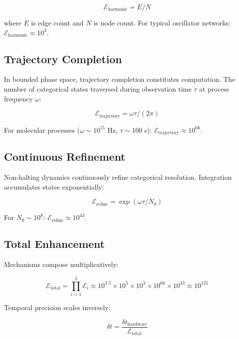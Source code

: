 \documentclass[10pt,twocolumn]{article}
\theoremstyle{definition}
\theoremstyle{remark}
\begin{document}
\begin{equation}
\mathcal{E}_{\text{harmonic}} = E / N
\end{equation}

where $E$ is edge count and $N$ is node count. For typical oscillator networks: $\mathcal{E}_{\text{harmonic}} \approx 10^{3}$.

\subsection{Trajectory Completion}

In bounded phase space, trajectory completion constitutes computation. The number of categorical states traversed during observation time $\tau$ at process frequency $\omega$:

\begin{equation}
\mathcal{E}_{\text{trajectory}} = \omega \tau / (2\pi)
\end{equation}

For molecular processes ($\omega \sim 10^{15}$ Hz, $\tau \sim 100$ s): $\mathcal{E}_{\text{trajectory}} \approx 10^{66}$.

\subsection{Continuous Refinement}

Non-halting dynamics continuously refine categorical resolution. Integration accumulates states exponentially:

\begin{equation}
\mathcal{E}_{\text{refine}} = \exp(\omega \tau / N_0)
\end{equation}

For $N_0 \sim 10^{8}$: $\mathcal{E}_{\text{refine}} \approx 10^{43}$.

\subsection{Total Enhancement}

Mechanisms compose multiplicatively:

\begin{equation}
\mathcal{E}_{\text{total}} = \prod_{i=1}^{5} \mathcal{E}_i \approx 10^{3.5} \times 10^{5} \times 10^{3} \times 10^{66} \times 10^{43} \approx 10^{121}
\end{equation}

Temporal precision scales inversely:

\begin{equation}
\delta t = \frac{\delta t_{\text{hardware}}}{\mathcal{E}_{\text{total}}}
\end{equation}
\end{document}

